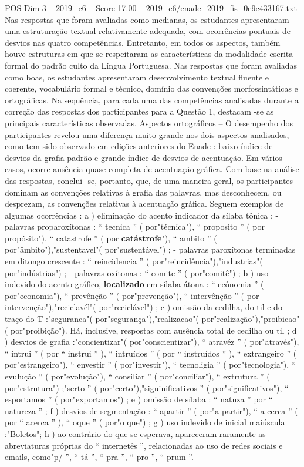 \begin{textsample}{POS Dim 3 – 2019\_c6 – Score 17.00 – 2019\_c6/enade\_2019\_fis\_0e9c433167.txt}
Nas respostas que foram avaliadas como medianas, os estudantes apresentaram uma estruturação textual relativamente adequada, com ocorrências pontuais de desvios nas quatro competências.
Entretanto, em todos os aspectos, também houve estruturas em que se respeitaram as características da modalidade escrita formal do padrão culto da Língua Portuguesa.
Nas respostas que foram avaliadas como boas, os estudantes apresentaram desenvolvimento textual fluente e coerente, vocabulário formal e técnico, domínio das convenções morfossintáticas e ortográficas.
Na sequência, para cada uma das competências analisadas durante a correção das respostas dos participantes para a Questão 1, destacam -se as principais características observadas.
Aspectos ortográficos – O desempenho dos participantes revelou uma diferença muito grande nos dois aspectos analisados, como tem sido observado em edições anteriores do Enade : baixo índice de desvios da grafia padrão e grande índice de desvios de acentuação.
Em vários casos, ocorre ausência quase completa de acentuação gráfica.
Com base na análise das respostas, conclui -se, portanto, que, de uma maneira geral, os participantes dominam as convenções relativas à grafia das palavras, mas desconhecem, ou desprezam, as convenções relativas à acentuação gráfica.
Seguem exemplos de algumas ocorrências : a ) eliminação do acento indicador da sílaba tônica : - palavras proparoxítonas : “ tecnica ” ( por"técnica"), “ proposito ” ( por propósito"), “ catastrofe ” ( por \textbf{catástrofe}"), “ ambito ” ( por"âmbito"),"sustentavel"( por"sustentável") ; - palavras paroxítonas terminadas em ditongo crescente : “ reincidencia ” ( por"reincidência"),"industrias"( por"indústrias") ; - palavras oxítonas : “ comite ” ( por"comitê") ; b ) uso indevido do acento gráfico, \textbf{localizado} em sílaba átona : “ ecônomia ” ( por"economia"), “ prevênção ” ( por"prevenção"), “ intervênção ” ( por intervenção"),"reciclavél"( por"reciclável") ; c ) omissão da cedilha, do til e do traço do T :"seguranca"( por"segurança"),"realizacao"( por"realização"),"proibicao"( por"proibição").
Há, inclusive, respostas com ausência total de cedilha ou til ; d ) desvios de grafia :"concientizar"( por"conscientizar"), “ atravéz ” ( por"através"), “ intrui ” ( por “ instrui ” ), “ intruídos ” ( por “ instruídos ” ), “ extrangeiro ” ( por"estrangeiro"), “ envestir ” ( por"investir"), “ tecnoligia ” ( por"tecnologia"), “ evulução ” ( por"evolução"), “ consiliar ” ( por"conciliar"), “ extrutura ” ( por"estrutura") ;"serto ” ( por"certo"),"siguinificativos ” ( por"significativos"), “ esportamos ” ( por"exportamos") ; e ) omissão de sílaba : “ natuza ” por “ natureza ” ; f ) desvios de segmentação : “ apartir ” ( por"a partir"), “ a cerca ” ( por “ acerca ” ), “ oque ” ( por"o que") ; g ) uso indevido de inicial maiúscula :"Boletos"; h ) ao contrário do que se esperava, apareceram raramente as abreviaturas próprias do “ internetês ”, relacionadas ao uso de redes sociais e emails, como"p/ ”, “ tá ”, “ pra ”, “ pro ”, “ prum ”.

\end{textsample}
